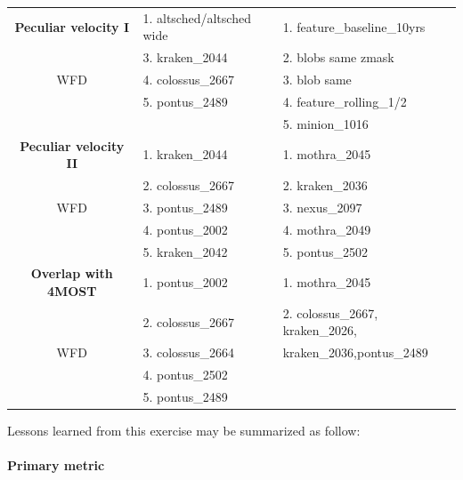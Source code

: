 \documentclass[a4paper,10pt]{article}
\begin{document}
\begin{table}[!htbp]
\begin{center}
\begin{tabular}{c|l|l}
{\bf Peculiar velocity I}      & 1. altsched/altsched wide                &  1. feature\_baseline\_10yrs \\
                               & 3. kraken\_2044                          &  2. blobs same zmask\\
      WFD                      & 4. colossus\_2667                        & 3. blob same \\
                               & 5. pontus\_2489                          & 4. feature\_rolling\_1/2\\
                               &                                          &  5.  minion\_1016\\
      \hline
{\bf Peculiar velocity II}     & 1. kraken\_2044                          &  1. mothra\_2045 \\
                               & 2. colossus\_2667                        &  2. kraken\_2036 \\
      WFD                      & 3. pontus\_2489                          &  3. nexus\_2097 \\
                               & 4. pontus\_2002                          &  4. mothra\_2049 \\
                               & 5. kraken\_2042                           &  5.  pontus\_2502 \\
      \hline

 {\bf Overlap with 4MOST}      & 1. pontus\_2002                          &  1. mothra\_2045\\
                               & 2. colossus\_2667                        & 2. colossus\_2667, kraken\_2026,\\
   WFD                         & 3. colossus\_2664                        &  kraken\_2036,pontus\_2489 \\
                               & 4. pontus\_2502                          &  \\
                               & 5. pontus\_2489                          &  \\
     \hline
\end{tabular}
\end{center}
\end{table}

\noindent Lessons learned from this exercise may be summarized as follow:

\paragraph{Primary metric} 
\end{document}
